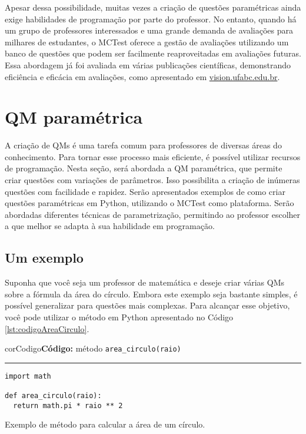 Apesar dessa possibilidade, muitas vezes a criação de questões paramétricas ainda exige habilidades de programação por parte do professor. No entanto, quando há um grupo de professores interessados e uma grande demanda de avaliações para milhares de estudantes, o MCTest oferece a gestão de avaliações utilizando um banco de questões que podem ser facilmente reaproveitadas em avaliações futuras. Essa abordagem já foi avaliada em várias publicações científicas, demonstrando eficiência e eficácia em avaliações, como apresentado em \href{http://vision.ufabc.edu.br}{vision.ufabc.edu.br}. 

\section{QM paramétrica}

A criação de QMs é uma tarefa comum para professores de diversas áreas do conhecimento. Para tornar esse processo mais eficiente, é possível utilizar recursos de programação. Nesta seção, será abordada a QM paramétrica, que permite criar questões com variações de parâmetros. Isso possibilita a criação de inúmeras questões com facilidade e rapidez. Serão apresentados exemplos de como criar questões paramétricas em Python, utilizando o MCTest como plataforma. Serão abordadas diferentes técnicas de parametrização, permitindo ao professor escolher a que melhor se adapta à sua habilidade em programação.


\subsection{Um exemplo}

Suponha que você seja um professor de matemática e deseje criar várias QMs sobre a fórmula da área do círculo. Embora este exemplo seja bastante simples, é possível generalizar para questões mais complexas. Para alcançar esse objetivo, você pode utilizar o método em Python apresentado no Código \ref{lst:codigoAreaCirculo}.


\begin{listing}[!ht]
\begin{myboxCode}{corCodigo}{\textbf{Código: } método \verb|area_circulo(raio)|}\vspace{3mm}
\hrule
\begin{verbatim}
import math

def area_circulo(raio):
  return math.pi * raio ** 2
\end{verbatim}
\end{myboxCode}
\caption{Exemplo de método para calcular a área de um círculo.}
\label{lst:codigoAreaCirculo}
\end{listing}


